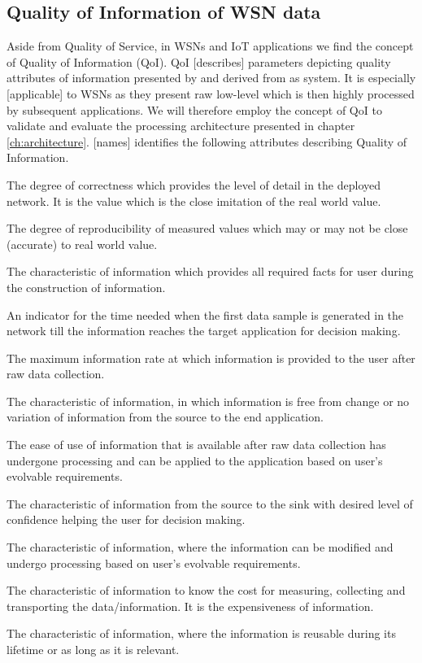 \subsection{Quality of Information of WSN data}
\label{sec:back:qoi}
Aside from Quality of Service, in WSNs and IoT applications we find the concept of Quality of Information (QoI). QoI [describes] parameters depicting quality attributes of information presented by and derived from as system. It is especially [applicable] to WSNs as they present raw low-level which is then highly processed by subsequent applications. We will therefore employ the concept of QoI to validate and evaluate the processing architecture presented in chapter \ref{ch:architecture}. [names]\cite{qoi_definition} identifies the following attributes describing Quality of Information.
\begin{description}
\nospace
\item[Accuracy] The degree of correctness which provides the level of detail in the deployed network. It is the value which is the close imitation of the real world value.
\item[Precision] The degree of reproducibility of measured values which may or may not be close (accurate) to real world value.
\item[Completeness] The characteristic of information which provides all required facts for user during the construction of information.
\item[Timeliness] An indicator for the time needed when the first data sample is generated in the network till the information reaches the target application for decision making.
\item[Throughput] The maximum information rate at which information is provided to the user after raw data collection.
\item[Reliability] The characteristic of information, in which information is free from change or no variation of information from the source to the end application.
\item[Usability] The ease of use of information that is available after raw data collection has undergone processing and can be applied to the application based on user's evolvable requirements.
\item[Certainty] The characteristic of information from the source to the sink with desired level
of confidence helping the user for decision making.
\item[Tunability] The characteristic of information, where the information can be modified and undergo processing based on user's evolvable requirements.
\item[Affordability] The characteristic of information to know the cost for measuring, collecting and
transporting the data/information. It is the expensiveness of information. 
\item[Reusability] The characteristic of information, where the information is reusable during its lifetime or as long as it is relevant.
\end{description}
